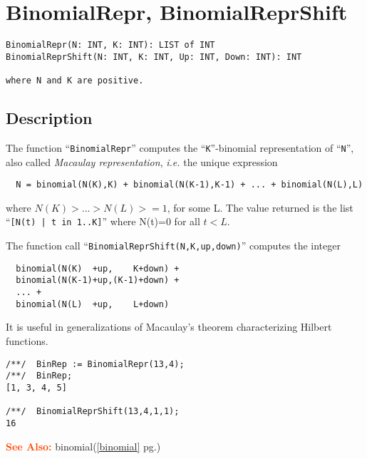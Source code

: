 \documentclass[a4paper]{mybook}
\newenvironment{command}{}{} %
\newcommand\SeeAlso{\par\textcolor{OrangeRed}{\textbf{\large See Also: }}}
\begin{document}
\section{BinomialRepr, BinomialReprShift}
\label{BinomialRepr, BinomialReprShift}
\begin{command} %


\begin{Verbatim}[label=syntax, rulecolor=\color{MidnightBlue},
frame=single]
BinomialRepr(N: INT, K: INT): LIST of INT
BinomialReprShift(N: INT, K: INT, Up: INT, Down: INT): INT

where N and K are positive.
\end{Verbatim}


\subsection*{Description}

The function ``\verb&BinomialRepr&'' computes the ``\verb&K&''-binomial
representation of ``\verb&N&'', also called \textit{Macaulay representation},
\textit{i.e.} the unique expression
\begin{verbatim}
  N = binomial(N(K),K) + binomial(N(K-1),K-1) + ... + binomial(N(L),L)
\end{verbatim}
where $N(K) > ... > N(L) >= 1$, for some L.
The value returned is the list ``\verb&[N(t) | t in 1..K]&''
where N(t)=0 for all $t < L$.
\par 
The function call ``\verb&BinomialReprShift(N,K,up,down)&'' computes the integer
\begin{verbatim}
  binomial(N(K)  +up,    K+down) +
  binomial(N(K-1)+up,(K-1)+down) +
  ... +
  binomial(N(L)  +up,    L+down)
\end{verbatim}
It is useful in generalizations of Macaulay's theorem characterizing
Hilbert functions.
\begin{Verbatim}[label=example, rulecolor=\color{PineGreen}, frame=single]
/**/  BinRep := BinomialRepr(13,4);
/**/  BinRep;
[1, 3, 4, 5]

/**/  BinomialReprShift(13,4,1,1);
16
\end{Verbatim}


\SeeAlso %
  binomial(\ref{binomial} pg.\pageref{binomial})
\end{command} %
\end{document}
